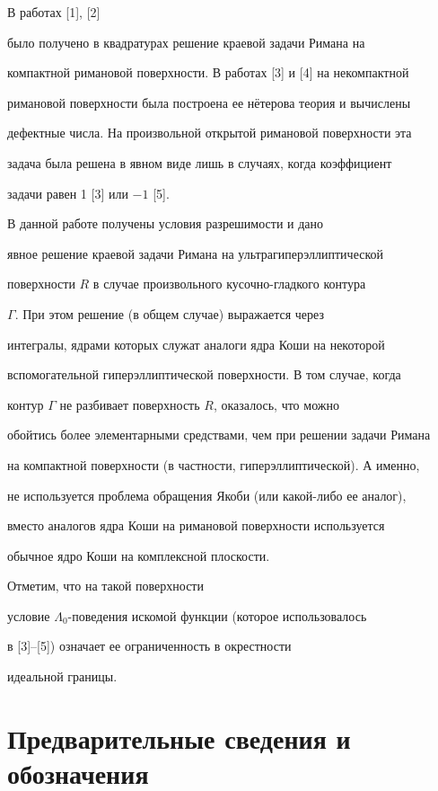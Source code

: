 \label{begin}





В работах [1], [2]


было получено в квадратурах решение краевой задачи Римана на


компактной римановой поверхности. В работах [3] и [4] на некомпактной


римановой поверхности была построена ее н\"етерова теория и вычислены


дефектные числа. На произвольной открытой римановой поверхности эта


задача была решена в явном виде лишь в случаях, когда коэффициент


задачи равен 1 [3] или $-1$ [5].


В данной работе получены условия разрешимости и дано


явное решение краевой задачи Римана на ультрагиперэллиптической


поверхности $R$ в случае произвольного кусочно-гладкого контура


$\Gamma$. При этом решение (в общем случае) выражается через


интегралы, ядрами которых служат аналоги ядра Коши на некоторой


вспомогательной гиперэллиптической поверхности. В том случае, когда


контур $\Gamma$ не разбивает поверхность $R$, оказалось, что можно


обойтись более элементарными средствами, чем при решении задачи Римана


на компактной поверхности (в частности, гиперэллиптической). А именно,


не используется проблема обращения Якоби (или какой-либо ее аналог),


вместо аналогов ядра Коши на римановой поверхности используется


обычное ядро Коши на комплексной плоскости.


Отметим, что на такой поверхности


условие $\Lambda_0$-поведения искомой функции (которое использовалось


в [3]--[5]) означает ее ограниченность в окрестности


идеальной границы.





\section{Предварительные сведения и обозначения}





